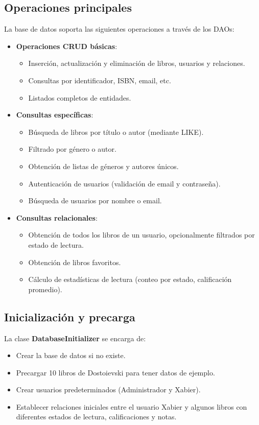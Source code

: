 \documentclass[a4paper,10pt]{report}
\begin{document}
      \subsection{Operaciones principales}
        La base de datos soporta las siguientes operaciones a través de los DAOs:
        \begin{itemize}
          \item \textbf{Operaciones CRUD básicas}:
            \begin{itemize}
              \item Inserción, actualización y eliminación de libros, usuarios y relaciones.
              \item Consultas por identificador, ISBN, email, etc.
              \item Listados completos de entidades.
            \end{itemize}
          \item \textbf{Consultas específicas}:
            \begin{itemize}
              \item Búsqueda de libros por título o autor (mediante LIKE).
              \item Filtrado por género o autor.
              \item Obtención de listas de géneros y autores únicos.
              \item Autenticación de usuarios (validación de email y contraseña).
              \item Búsqueda de usuarios por nombre o email.
            \end{itemize}
          \item \textbf{Consultas relacionales}:
            \begin{itemize}
              \item Obtención de todos los libros de un usuario, opcionalmente filtrados por estado de lectura.
              \item Obtención de libros favoritos.
              \item Cálculo de estadísticas de lectura (conteo por estado, calificación promedio).
            \end{itemize}
        \end{itemize}
      \subsection{Inicialización y precarga}
        La clase \textbf{DatabaseInitializer} se encarga de:
        \begin{itemize}
          \item Crear la base de datos si no existe.
          \item Precargar 10 libros de Dostoievski para tener datos de ejemplo.
          \item Crear usuarios predeterminados (Administrador y Xabier).
          \item Establecer relaciones iniciales entre el usuario Xabier y algunos libros con diferentes estados de lectura, calificaciones y notas.
        \end{itemize}
\end{document}
